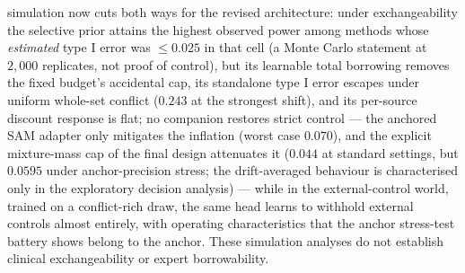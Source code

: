 \documentclass[11pt]{article}
\begin{document}
simulation now cuts both ways for the revised architecture: under
exchangeability the selective prior attains the highest observed power
among methods whose \emph{estimated} type I error was $\le 0.025$ in that
cell (a Monte Carlo statement at $2{,}000$ replicates, not proof of
control), but its learnable total borrowing
removes the fixed budget's accidental cap, its standalone type I error
escapes under uniform whole-set conflict ($0.243$ at the strongest shift),
and its per-source discount response is flat; no companion restores strict
control --- the anchored SAM adapter only mitigates the inflation (worst
case $0.070$), and the explicit mixture-mass cap of the final design
attenuates it ($0.044$ at standard settings, but $0.0595$ under
anchor-precision stress; the drift-averaged behaviour is characterised
only in the exploratory decision analysis) --- while in the
external-control world, trained on a conflict-rich draw, the same head
learns to withhold external controls almost entirely, with operating
characteristics that the anchor stress-test battery shows belong to the
anchor. These
simulation analyses do not
establish clinical exchangeability or expert borrowability.
\end{document}
